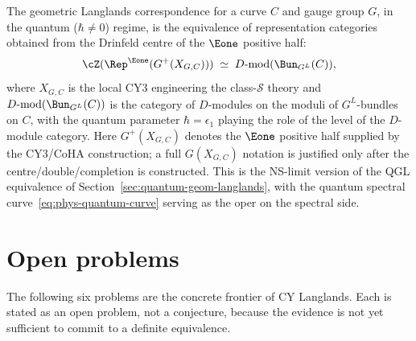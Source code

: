 \begin{conjecture}
\label{conj:phys-qvcg-langlands-ns}
\ClaimStatusConjectured
The geometric Langlands correspondence for a curve $C$ and gauge group $G$,
in the quantum ($\hbar \neq 0$) regime, is the equivalence of representation
categories obtained from the Drinfeld centre of the $\Eone$ positive half:
\begin{equation}\label{eq:phys-qvcg-langlands}
 \cZ(\Rep^{\Eone}(G^+(X_{G,C}))) \;\simeq\; D\text{-}\mathrm{mod}(\Bun_{G^L}(C)),
\end{equation}
where $X_{G,C}$ is the local CY3 engineering the class-$\mathcal{S}$ theory
and $D\text{-}\mathrm{mod}(\Bun_{G^L}(C))$ is the category of $D$-modules on
the moduli of $G^L$-bundles on $C$, with the quantum parameter $\hbar = \epsilon_1$
playing the role of the level of the $D$-module category. Here $G^+(X_{G,C})$
denotes the $\Eone$ positive half supplied by the CY3/CoHA construction; a full
$G(X_{G,C})$ notation is justified only after the centre/double/completion is
constructed. This is the NS-limit version of the QGL equivalence of
Section~\ref{sec:quantum-geom-langlands}, with the quantum spectral
curve~\eqref{eq:phys-quantum-curve} serving as the oper on the spectral side.
\end{conjecture}

\section{Open problems}
\label{sec:open-problems}

The following six problems are the concrete frontier of CY Langlands. Each is stated as an open problem, not a conjecture, because the evidence is not yet sufficient to commit to a definite equivalence.

